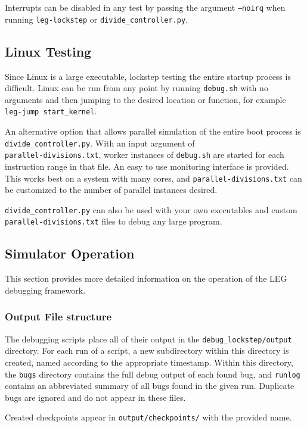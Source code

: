 Interrupts can be disabled in any test by passing the argument \texttt{--noirq} when running \texttt{leg-lockstep} or \texttt{divide\_controller.py}.

\subsection{Linux Testing}
Since Linux is a large executable, lockstep testing the entire startup process is difficult. 
Linux can be run from any point by running \texttt{debug.sh} with no arguments and then jumping to the desired location or function, for example \texttt{leg-jump start\_kernel}.

An alternative option that allows parallel simulation of the entire boot process is \\\texttt{divide\_controller.py}. 
With an input argument of \\\texttt{parallel-divisions.txt}, worker instances of \texttt{debug.sh} are started for each instruction range in that file. 
An easy to use monitoring interface is provided.
This works best on a system with many cores, and \texttt{parallel-divisions.txt} can be customized to the number of parallel instances desired.

\texttt{divide\_controller.py} can also be used with your own executables and custom \\\texttt{parallel-divisions.txt} files to debug any large program.

\subsection{Simulator Operation}
This section provides more detailed information on the operation of the LEG debugging framework.

\subsubsection{Output File structure}
The debugging scripts place all of their output in the \texttt{debug\_lockstep/output} directory. For each run of a script, a new subdirectory within this directory is created, named according to the appropriate timestamp. Within this directory, the \texttt{bugs} directory contains the full debug output of each found bug, and \texttt{runlog} contains an abbreviated summary of all bugs found in the given run. Duplicate bugs are ignored and do not appear in these files.

Created checkpoints appear in \texttt{output/checkpoints/} with the provided name.



